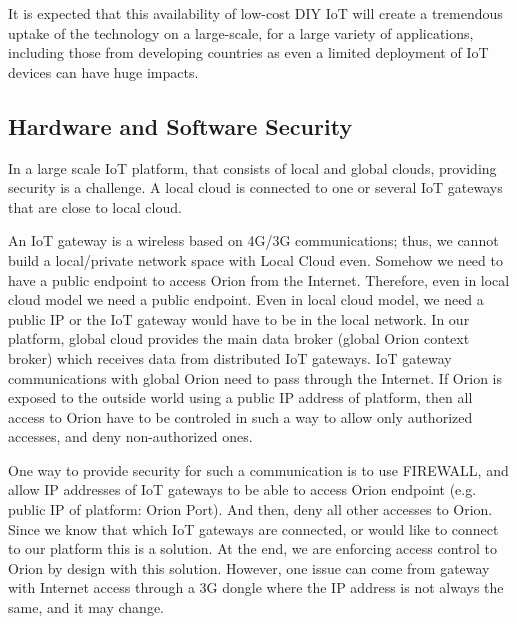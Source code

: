 It is expected that this availability of low-cost DIY IoT will create a tremendous uptake of the technology on a large-scale, for a large variety of applications, including those from developing countries as even a limited deployment of IoT devices can have huge impacts.

\subsection{Hardware and Software Security}
In a large scale IoT platform, that consists of local and global clouds, providing security is a challenge. A local cloud is connected to one or several IoT gateways that are close to local cloud. 

An IoT gateway is a wireless based on 4G/3G communications; thus, we cannot build a local/private network space with Local Cloud even. Somehow we need to have a public endpoint to access Orion from the Internet. Therefore, even in local cloud model we need a public endpoint. Even in local cloud model, we need a public IP or the IoT gateway would have to be in the local network.
In our platform, global cloud provides the main data broker (global Orion context broker) which receives data from distributed IoT gateways. IoT gateway communications with global Orion need to pass through the Internet. If Orion is exposed to the outside world using a public IP address of platform, then all access to Orion have to be controled in such a way to allow only authorized accesses, and deny non-authorized ones.

One way to provide security for such a communication is to use FIREWALL, and allow IP addresses of IoT gateways to be able to access Orion endpoint (e.g. public IP of platform: Orion Port). And then, deny all other accesses to Orion. Since we know that which IoT gateways are connected, or would like to connect to our platform this is a solution. At the end, we are enforcing access control to Orion by design with this solution. However, one issue can come from gateway with Internet access through a 3G dongle where the IP address is not always the same, and it may change. 

